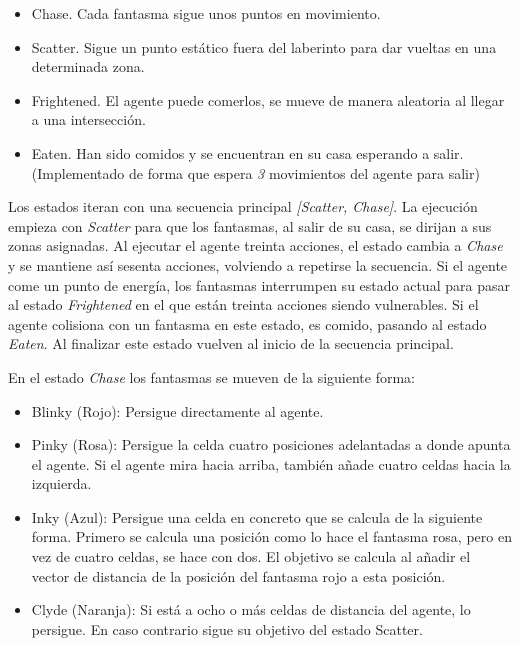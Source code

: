 		\begin{itemize}
			\item Chase. Cada fantasma sigue unos puntos en movimiento.
			\vspace*{-0.3cm}
			\item Scatter. Sigue un punto estático fuera del laberinto para dar vueltas en una determinada zona.
			\vspace*{-0.3cm}
			\item Frightened. El agente puede comerlos, se mueve de manera aleatoria al llegar a una intersección.
			\vspace*{-0.3cm}
			\item Eaten. Han sido comidos y se encuentran en su casa esperando a salir. (Implementado de forma que espera \textit{3} movimientos del agente para salir)
		\end{itemize} 
		
		Los estados iteran con una secuencia principal \textit{[Scatter, Chase]}. La ejecución empieza con \textit{Scatter} para que los fantasmas, al salir de su casa, se dirijan a sus zonas asignadas. Al ejecutar el agente treinta acciones, el estado cambia a \textit{Chase} y se mantiene así sesenta acciones, volviendo a repetirse la secuencia. Si el agente come un punto de energía, los fantasmas interrumpen su estado actual para pasar al estado \textit{Frightened} en el que están treinta acciones siendo vulnerables. Si el agente colisiona con un fantasma en este estado, es comido, pasando al estado \textit{Eaten}. Al finalizar este estado vuelven al inicio de la secuencia principal.
		
		
		\begin{flushleft}
			En el estado \textit{Chase} los fantasmas se mueven de la siguiente forma:
		\end{flushleft}
		
		\vspace{-0.9cm}
		\begin{itemize}
			\item Blinky (Rojo): Persigue directamente al agente.
			\vspace*{-0.3cm}
			\item Pinky (Rosa): Persigue la celda cuatro posiciones adelantadas a donde apunta el agente. Si el agente mira hacia arriba, también añade cuatro celdas hacia la izquierda.
			\vspace*{-0.3cm}
			\item Inky (Azul): Persigue una celda en concreto que se calcula de la siguiente forma. Primero se calcula una posición como lo hace el fantasma rosa, pero en vez de cuatro celdas, se hace con dos. El objetivo se calcula al añadir el vector de distancia de la posición del fantasma rojo a esta posición.
			\vspace*{-0.3cm}
			\item Clyde (Naranja): Si está a ocho o más celdas de distancia del agente, lo persigue. En caso contrario sigue su objetivo del estado Scatter.
		\end{itemize}
		
